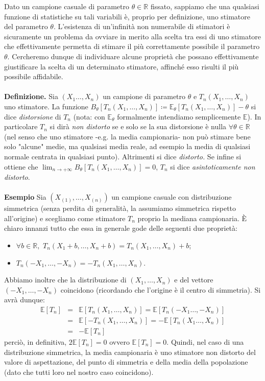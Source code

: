 Dato un campione casuale di parametro $\theta\in \mathbb{R}$ fissato, sappiamo che una qualsiasi funzione di statistiche su tali variabili è, proprio per definizione, uno stimatore del parametro $\theta$. L'esistenza di un'infinità non numerabile di stimatori è sicuramente un problema da ovviare in merito alla scelta tra essi di uno stimatore che effettivamente permetta di stimare il più correttamente possibile il parametro $\theta$. Cercheremo dunque di individuare alcune proprietà che possano effettivamente giustificare la scelta di un determinato stimatore, affinché esso risulti il più possibile affidabile.\\ \\
\textbf{Definizione.} Sia $(X_1\ldots,X_n)$ un campione di parametro $\theta$ e $T_n(X_1,\ldots,X_n)$ uno stimatore. La funzione $B_{\theta}[T_n(X_1,\ldots,X_n)]\coloneqq \mathbb{E}_{\theta}[T_n(X_1,\ldots,X_n)]-\theta$ si dice \textit{distorsione} di $T_n$ (nota: con $\mathbb{E}_{\theta}$ formalmente intendiamo semplicemente $\mathbb{E}$). In particolare $T_n$ si dirà \textit{non distorto} se e solo se la sua distorsione è nulla $\forall \theta\in \mathbb{R}$ (nel senso che uno stimatore -e.g. la media campionaria- non può stimare bene solo "alcune" medie, ma qualsiasi media reale, ad esempio la media di qualsiasi normale centrata in qualsiasi punto). Altrimenti si dice \textit{distorto.} Se infine si ottiene che $\lim_{n\rightarrow +\infty} B_{\theta}[T_n(X_1,\ldots,X_n)]=0$, $T_n$ si dice \textit{asintoticamente non distorto}.
\\ \\
\noindent \textbf{Esempio} Sia $(X_{(1)},\ldots,X_{(n)})$ un campione casuale con distribuzione simmetrica (senza perdita di generalità, la assumiamo simmetrica rispetto all'origine) e scegliamo come stimatore $T_n$ proprio la mediana campionaria. È chiaro innanzi tutto che essa in generale gode delle seguenti due proprietà: \begin{itemize}
\item $\forall b\in \mathbb{R}, $ $T_n(X_1+b,\ldots,X_n+b)=T_n(X_1,\ldots,X_n)+b$;
\item $T_n(-X_ 1,\ldots,-X_n)=-T_n(X_1,\ldots,X_n)$.
\end{itemize}
Abbiamo inoltre che la distribuzione di $(X_ 1,\ldots,X_n)$ e del vettore $(-X_ 1,\ldots,-X_n)$ coincidono (ricordando che l'origine è il centro di simmetria). Si avrà dunque: 
\begin{eqnarray*}
\mathbb{E}[T_n] &=& \mathbb{E}[T_n(X_1,\ldots, X_n)]=\mathbb{E}[T_n(-X_1\ldots ,-X_n)] \\
&=& \mathbb{E}[-T_n(X_1,\ldots, X_n)] = -\mathbb{E}[T_n(X_1\ldots ,X_n)] \\
&=& -\mathbb{E}[T_n]
\end{eqnarray*}
perciò, in definitiva, $2\mathbb{E}[T_n]=0$ ovvero $\mathbb{E}[T_n]=0$. Quindi, nel caso di una distribuzione simmetrica, la media campionaria è uno stimatore non distorto del valore di aspettazione, del punto di simmetria e della media della popolazione (dato che tutti loro nel nostro caso coincidono). \\

